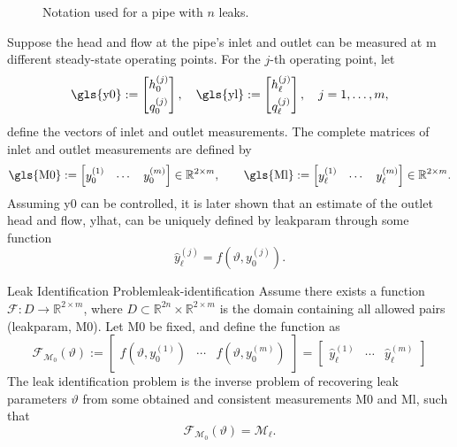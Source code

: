 \begin{figure}[h!]
    \centering
    
    \caption{Notation used for a pipe with $n$ leaks.}
    \label{fig:leak_notation}
\end{figure}

Suppose the head and flow at the pipe's inlet and outlet can be measured at \gls{m} different steady-state operating points. For the $j$-th operating point, let
\begin{equation*}
\text{\gls{y0}} :=\begin{bmatrix}
    h_0^{(j)} \\[0.4em]
    q_0^{(j)}
\end{bmatrix}, \quad
\text{\gls{yl}} := \begin{bmatrix}
    h_{\ell}^{(j)} \\[0.4em]
    q_{\ell}^{(j)}
\end{bmatrix}, \quad
j=1,\dots,m,
\end{equation*}
define the vectors of inlet and outlet measurements. The complete matrices of inlet and outlet measurements are defined by
\[
\text{\gls{M0}}
:=
\begin{bmatrix}
y_0^{(1)} & \cdots & y_0^{(m)}
\end{bmatrix} \in\mathbb{R}^{2\times m},
\qquad
\text{\gls{Ml}}
:=
\begin{bmatrix}
y_{\ell}^{(1)} & \cdots & y_{\ell}^{(m)}
\end{bmatrix} \in\mathbb{R}^{2\times m}.
\]
Assuming \gls{y0} can be controlled, it is later shown that an estimate of the outlet head and flow, \gls{ylhat}, can be uniquely defined by \gls{leakparam} through some function
\begin{equation*}
    \hat{y}_\ell^{(j)} = f(\vartheta,y_0^{(j)}).
\end{equation*}

\begin{definition}{Leak Identification Problem}{leak-identification}
Assume there exists a function $\mathcal{F} : D \to \mathbb{R}^{2\times m}$, where $D\subset \mathbb{R}^{2n}\times\mathbb{R}^{2\times m}$ is the domain containing all allowed pairs (\gls{leakparam}, \gls{M0}). Let \gls{M0} be fixed, and define the function as
\[
\mathcal{F}_{\mathcal{M}_0}(\vartheta) := \begin{bmatrix}
    f(\vartheta,y_0^{(1)}) & \cdots & f(\vartheta,y_0^{(m)})
\end{bmatrix} =
\begin{bmatrix}
\hat{y}_{\ell}^{(1)} & \cdots & \hat{y}_{\ell}^{(m)}
\end{bmatrix}
\]
The leak identification problem is the inverse problem of recovering leak parameters $\vartheta$ from some obtained and consistent measurements \gls{M0} and \gls{Ml}, such that
\[
\mathcal{F}_{\mathcal{M}_0}(\vartheta)=\mathcal{M}_\ell.
\]
\end{definition}
\vspace{3mm}

